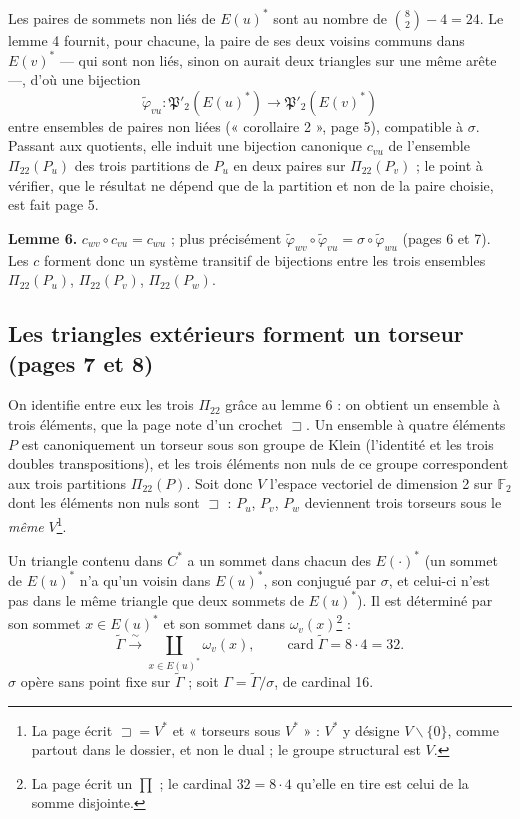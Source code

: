 \documentclass[11pt,a4paper]{article}
\begin{document}
Les paires de sommets non liés de $E(u)^*$ sont au nombre de $\binom 82 - 4 =
24$. Le lemme 4 fournit, pour chacune, la paire de ses deux voisins communs
dans $E(v)^*$ --- qui sont non liés, sinon on aurait deux triangles sur une
même arête ---, d'où une bijection
\[
\widetilde\varphi_{vu} : \mathfrak{P}'_2(E(u)^*) \longrightarrow
\mathfrak{P}'_2(E(v)^*)
\]
entre ensembles de paires non liées (« corollaire 2 », page 5), compatible à
$\sigma$. Passant aux quotients, elle induit une bijection canonique $c_{vu}$
de l'ensemble $\Pi_{22}(P_u)$ des trois partitions de $P_u$ en deux paires sur
$\Pi_{22}(P_v)$ ; le point à vérifier, que le résultat ne dépend que de la
partition et non de la paire choisie, est fait page 5.

\textbf{Lemme 6.} $c_{wv} \circ c_{vu} = c_{wu}$ ; plus précisément
$\widetilde\varphi_{wv} \circ \widetilde\varphi_{vu} = \sigma \circ
\widetilde\varphi_{wu}$ (pages 6 et 7). Les $c$ forment donc un système
transitif de bijections entre les trois ensembles $\Pi_{22}(P_u)$,
$\Pi_{22}(P_v)$, $\Pi_{22}(P_w)$.

\subsection*{Les triangles extérieurs forment un torseur (pages 7 et 8)}

On identifie entre eux les trois $\Pi_{22}$ grâce au lemme 6 : on obtient un
ensemble à trois éléments, que la page note d'un crochet $\sqsupset$. Un
ensemble à quatre éléments $P$ est canoniquement un torseur sous son groupe de
Klein (l'identité et les trois doubles transpositions), et les trois éléments
non nuls de ce groupe correspondent aux trois partitions $\Pi_{22}(P)$. Soit
donc $V$ l'espace vectoriel de dimension 2 sur $\mathbb{F}_2$ dont les
éléments non nuls sont $\sqsupset$ : $P_u$, $P_v$, $P_w$ deviennent trois
torseurs sous le \emph{même} $V$\footnote{La page écrit $\sqsupset = V^*$ et
« torseurs sous $V^*$ » : $V^*$ y désigne $V \smallsetminus \lbrace 0\rbrace$,
comme partout dans le dossier, et non le dual ; le groupe structural est
$V$.}.

Un triangle contenu dans $C^*$ a un sommet dans chacun des $E(\cdot)^*$ (un
sommet de $E(u)^*$ n'a qu'un voisin dans $E(u)^*$, son conjugué par $\sigma$, et
celui-ci n'est pas dans le même triangle que deux sommets de $E(u)^*$). Il est
déterminé par son sommet $x \in E(u)^*$ et son sommet dans
$\omega_v(x)$\footnote{La page écrit un $\prod$ ; le cardinal $32 = 8 \cdot 4$
qu'elle en tire est celui de la somme disjointe.} :
\[
\widetilde\Gamma \xrightarrow{\ \sim\ } \coprod_{x \in E(u)^*} \omega_v(x),
\qquad \operatorname{card} \widetilde\Gamma = 8 \cdot 4 = 32 .
\]
$\sigma$ opère sans point fixe sur $\widetilde\Gamma$ ; soit $\Gamma =
\widetilde\Gamma/\sigma$, de cardinal 16.
\end{document}
